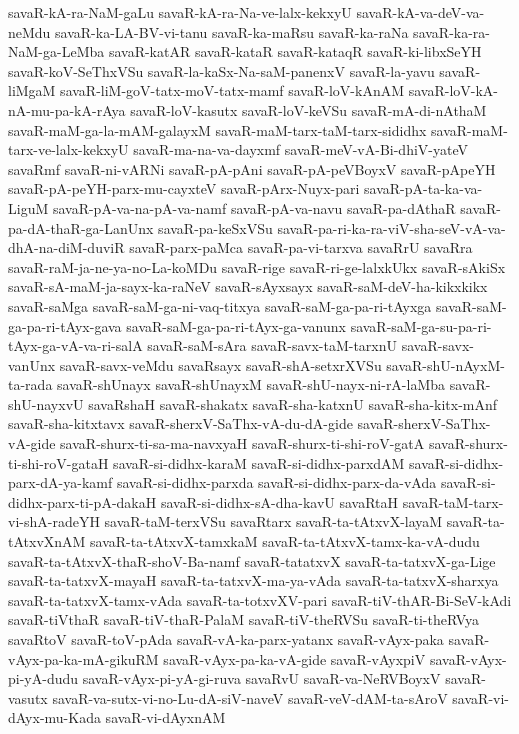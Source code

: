 {savaR-kA-ra-NaM-gaLu
savaR-kA-ra-Na-ve-lalx-kekxyU
savaR-kA-va-deV-va-neMdu
savaR-ka-LA-BV-vi-tanu
savaR-ka-maRsu
savaR-ka-raNa
savaR-ka-ra-NaM-ga-LeMba
savaR-katAR
savaR-kataR
savaR-kataqR
savaR-ki-libxSeYH
savaR-koV-SeThxVSu
savaR-la-kaSx-Na-saM-panenxV
savaR-la-yavu
savaR-liMgaM
savaR-liM-goV-tatx-moV-tatx-mamf
savaR-loV-kAnAM
savaR-loV-kA-nA-mu-pa-kA-rAya
savaR-loV-kasutx
savaR-loV-keVSu
savaR-mA-di-nAthaM
savaR-maM-ga-la-mAM-galayxM
savaR-maM-tarx-taM-tarx-sididhx
savaR-maM-tarx-ve-lalx-kekxyU
savaR-ma-na-va-dayxmf
savaR-meV-vA-Bi-dhiV-yateV
savaRmf
savaR-ni-vARNi
savaR-pA-pAni
savaR-pA-peVBoyxV
savaR-pApeYH
savaR-pA-peYH-parx-mu-cayxteV
savaR-pArx-Nuyx-pari
savaR-pA-ta-ka-va-LiguM
savaR-pA-va-na-pA-va-namf
savaR-pA-va-navu
savaR-pa-dAthaR
savaR-pa-dA-thaR-ga-LanUnx
savaR-pa-keSxVSu
savaR-pa-ri-ka-ra-viV-sha-seV-vA-va-dhA-na-diM-duviR
savaR-parx-paMca
savaR-pa-vi-tarxva
savaRrU
savaRra
savaR-raM-ja-ne-ya-no-La-koMDu
savaR-rige
savaR-ri-ge-lalxkUkx
savaR-sAkiSx
savaR-sA-maM-ja-sayx-ka-raNeV
savaR-sAyxsayx
savaR-saM-deV-ha-kikxkikx
savaR-saMga
savaR-saM-ga-ni-vaq-titxya
savaR-saM-ga-pa-ri-tAyxga
savaR-saM-ga-pa-ri-tAyx-gava
savaR-saM-ga-pa-ri-tAyx-ga-vanunx
savaR-saM-ga-su-pa-ri-tAyx-ga-vA-va-ri-salA
savaR-saM-sAra
savaR-savx-taM-tarxnU
savaR-savx-vanUnx
savaR-savx-veMdu
savaRsayx
savaR-shA-setxrXVSu
savaR-shU-nAyxM-ta-rada
savaR-shUnayx
savaR-shUnayxM
savaR-shU-nayx-ni-rA-laMba
savaR-shU-nayxvU
savaRshaH
savaR-shakatx
savaR-sha-katxnU
savaR-sha-kitx-mAnf
savaR-sha-kitxtavx
savaR-sherxV-SaThx-vA-du-dA-gide
savaR-sherxV-SaThx-vA-gide
savaR-shurx-ti-sa-ma-navxyaH
savaR-shurx-ti-shi-roV-gatA
savaR-shurx-ti-shi-roV-gataH
savaR-si-didhx-karaM
savaR-si-didhx-parxdAM
savaR-si-didhx-parx-dA-ya-kamf
savaR-si-didhx-parxda
savaR-si-didhx-parx-da-vAda
savaR-si-didhx-parx-ti-pA-dakaH
savaR-si-didhx-sA-dha-kavU
savaRtaH
savaR-taM-tarx-vi-shA-radeYH
savaR-taM-terxVSu
savaRtarx
savaR-ta-tAtxvX-layaM
savaR-ta-tAtxvXnAM
savaR-ta-tAtxvX-tamxkaM
savaR-ta-tAtxvX-tamx-ka-vA-dudu
savaR-ta-tAtxvX-thaR-shoV-Ba-namf
savaR-tatatxvX
savaR-ta-tatxvX-ga-Lige
savaR-ta-tatxvX-mayaH
savaR-ta-tatxvX-ma-ya-vAda
savaR-ta-tatxvX-sharxya
savaR-ta-tatxvX-tamx-vAda
savaR-ta-totxvXV-pari
savaR-tiV-thAR-Bi-SeV-kAdi
savaR-tiVthaR
savaR-tiV-thaR-PalaM
savaR-tiV-theRVSu
savaR-ti-theRVya
savaRtoV
savaR-toV-pAda
savaR-vA-ka-parx-yatanx
savaR-vAyx-paka
savaR-vAyx-pa-ka-mA-gikuRM
savaR-vAyx-pa-ka-vA-gide
savaR-vAyxpiV
savaR-vAyx-pi-yA-dudu
savaR-vAyx-pi-yA-gi-ruva
savaRvU
savaR-va-NeRVBoyxV
savaR-vasutx
savaR-va-sutx-vi-no-Lu-dA-siV-naveV
savaR-veV-dAM-ta-sAroV
savaR-vi-dAyx-mu-Kada
savaR-vi-dAyxnAM
}
